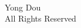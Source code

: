 

\begin{titlepage}
\begin{singlespacing}
\begin{center}

\vspace*{35\baselineskip}

\textcopyright  \,  \the\year\\
\vspace{\baselineskip}	
Yong Dou\\
\vspace{\baselineskip}	
All Rights Reserved
\end{center}
\vfill

\end{singlespacing}
\end{titlepage}
